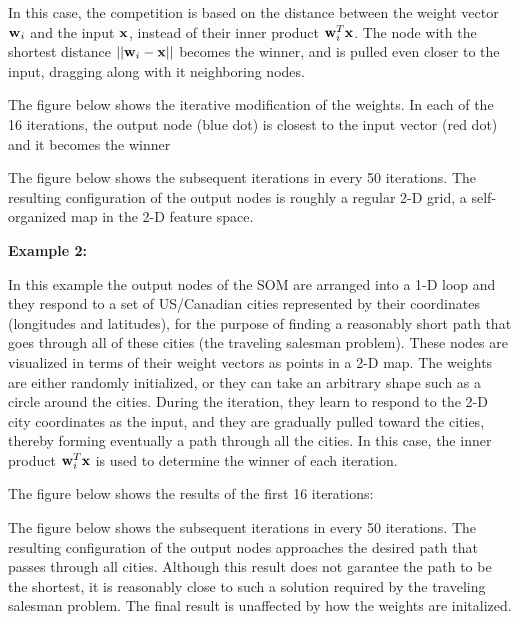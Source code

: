 \documentclass{article}
\begin{document}
In this case, the competition is based on the distance between the 
weight vector ${\bf w}_i$ and the input ${\bf x}$, instead of their 
inner product ${\bf w}^T_i{\bf x}$. The node with the shortest 
distance $||{\bf w}_i-{\bf x}||$ becomes the winner, and is pulled 
even closer to the input, dragging along with it neighboring nodes.

The figure below shows the iterative modification of the weights. In
each of the 16 iterations, the output node (blue dot) is closest to 
the input vector (red dot) and it becomes the winner



The figure below shows the subsequent iterations in every 50 iterations.
The resulting configuration of the output nodes is roughly a regular 2-D
grid, a self-organized map in the 2-D feature space.



{\bf Example 2:} 

In this example the output nodes of the SOM are arranged into a 1-D loop 
and they respond to a set of US/Canadian cities represented by their 
coordinates (longitudes and latitudes), for the purpose of finding a 
reasonably short path that goes through all of these cities (the
traveling salesman problem). These nodes are visualized in terms of 
their weight vectors as points in a 2-D map. The weights are either
randomly initialized, or they can take an arbitrary shape such as a
circle around the cities. During the iteration, they learn to respond 
to the 2-D city coordinates as the input, and they are gradually pulled 
toward the cities, thereby forming eventually a path through all the
cities. In this case, the inner product ${\bf w}_i^T{\bf x}$ is used
to determine the winner of each iteration.

The figure below shows the results of the first 16 iterations:


The figure below shows the subsequent iterations in every 50 iterations.
The resulting configuration of the output nodes approaches the desired 
path that passes through all cities. Although this result does not garantee 
the path to be the shortest, it is reasonably close to such a solution 
required by the traveling salesman problem. The final result is unaffected
by how the weights are initalized.

\end{document}
